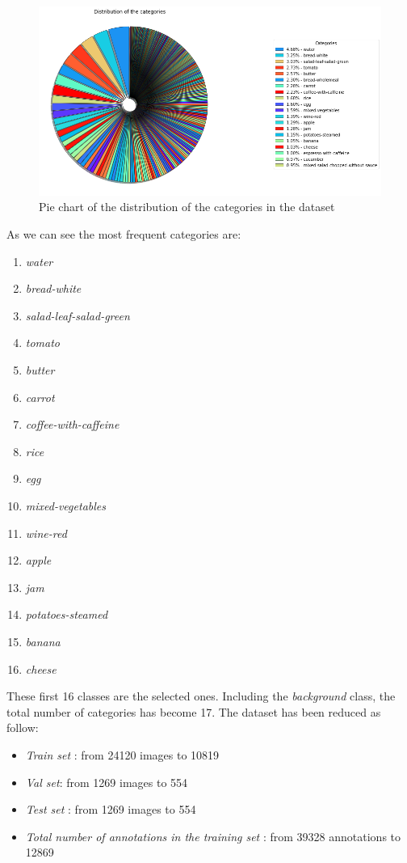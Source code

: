 \documentclass[a4paper,10pt]{report}
\begin{document}
\begin{figure}[h]
  \center
  \includegraphics[width=0.9\linewidth]{assets/img/dataset_distr.png}
  \caption{Pie chart of the distribution of the categories in the dataset}
  \label{fig:{dataset_dist}}
\end{figure}


As we can see the most frequent categories are:
\begin{enumerate}
    \item \emph{water}
    \item \emph{bread-white}
    \item \emph{salad-leaf-salad-green}
    \item \emph{tomato}
    \item \emph{butter}
    \item \emph{carrot}
    \item \emph{coffee-with-caffeine}
    \item \emph{rice}
    \item \emph{egg}
    \item \emph{mixed-vegetables}
    \item \emph{wine-red}
    \item \emph{apple}
    \item \emph{jam}
    \item \emph{potatoes-steamed}
    \item \emph{banana}
    \item \emph{cheese}
\end{enumerate}

These first 16 classes are the selected ones. Including the \emph{background} class, the total number of categories has become 17.
The dataset has been reduced as follow:
\begin{itemize}
    \item \emph{Train set} : from 24120 images to 10819
    \item \emph{Val set}: from 1269 images to 554
    \item \emph{Test set} : from 1269 images to 554
    \item \emph{Total number of annotations in the training set} : from 39328 annotations to 12869
\end{itemize}
\end{document}
